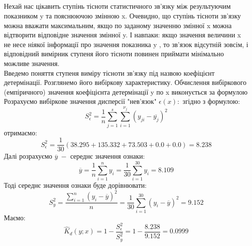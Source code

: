 \documentclass[12pt]{article}
\makeatletter
\newcommand{\bigcell}[2]{\begin{tabular}{@{}#1@{}}#2\end{tabular}}
\makeatother
\begin{document}
 \\ \\ \\ \\ 
Нехай нас цікавить ступінь тісноти статистичного зв’язку між результуючим показником y та пояснюючою змінною x. Очевидно, що ступінь тісноти зв’язку можна вважати максимальним, якщо по заданому значенню змінної x можна відтворити відповідне значення змінної y. І навпаки: якщо значення величини x не несе ніякої інформації про значення показника y , то зв’язок відсутній зовсім, і відповідний вимірник ступеня його тісноти повинен приймати мінімально можливе значення.\\
Введемо поняття ступеня виміру тісноти зв’язку під назвою коефіцієнт детермінації. Розглянемо його вибіркову характеристику. Обчислення вибіркового (емпіричного) значення коефіцієнта детермінації y по x виконується
за формулою 
Розрахуємо вибіркове значення дисперсії "нев'язок"  $\displaystyle \epsilon(x):$ згідно з формулою: $$\displaystyle S_{\epsilon}^2 = \frac{1}{n}\sum_{j=1}^s\sum_{i = 1}^{\nu_j}(y_{ji} - \overline{y_j})^2$$ отримаємо: 
$$\displaystyle S_{\epsilon}^2 = \frac{1}{30}(38.295 + 135.332 + 73.503 + 0.0 + 0.0) = 8.238$$
Далі розрахуємо $\displaystyle \overline{y} \; - $ середнє значення ознаки:
$$\displaystyle \overline{y} = \frac{1}{n}\sum_{i=1}^{n}y_{i} = \frac{1}{30}\sum_{i=1}^{30}y_{i} = 8.109$$
Тоді середнє значення ознаки буде дорівнювати:
$$\displaystyle S^{2}_{y} = \frac{\displaystyle \sum_{i=1}^{n} (y_{i} - \overline{y})^2}{n} = \frac{1}{30}\sum_{i=1}^{30} (y_{i} - \overline{y})^2 = 9.152$$
Маємо:
$$\displaystyle \widehat{K}_{d}(y;x) = 1 - \displaystyle\frac{\displaystyle S^{2}_{\epsilon}}{\displaystyle S^{2}_{y}} = 1 - \frac{8.238}{9.152} = 0.0999$$
\end{document}
